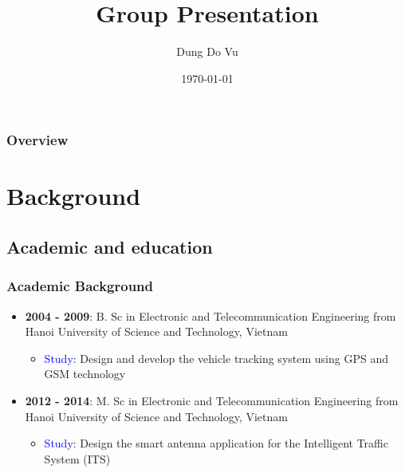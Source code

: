 \documentclass{beamer}
\title[Department of Electrical Engineering]{Group Presentation} %
\author{Dung Do Vu} %
\institute[ETSMTL] %
{
Department of Electrical Engineering \\
Ecole de Technologies Superieure (ETS),  University of Quebec, Montreal, Canada\\ %
\medskip
\textit{do-dung.vu.1@ens.etsmtl.ca} %
}
\date{\today} %
\begin{document}
\begin{frame}
\titlepage %
\end{frame}

\begin{frame}
\frametitle{Overview} %
\tableofcontents %
\end{frame}


\section{Background} %

\subsection{Academic and education} %



\begin{frame}
\frametitle{Academic Background}
\begin{itemize}
\item \textbf{2004 - 2009}: B. Sc in Electronic and Telecommunication Engineering from Hanoi University of Science and Technology, Vietnam 
\begin{itemize}
	\item \textcolor{blue}{Study}: Design and develop the vehicle tracking system using GPS and GSM technology 
\end{itemize}
\item \textbf{2012 - 2014}: M. Sc in Electronic and Telecommunication Engineering from Hanoi University of Science and Technology, Vietnam 
\begin{itemize}
	\item \textcolor{blue}{Study}: Design the smart antenna application for the Intelligent Traffic System (ITS)
\end{itemize}


\end{itemize}
\end{frame}
\end{document}
